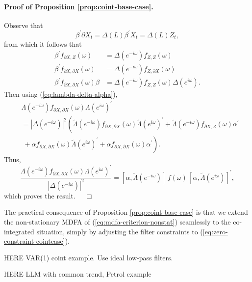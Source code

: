 \documentclass[a4paper]{book}
\begin{document}
\paragraph{Proof of Proposition \ref{prop:coint-base-case}.}
 Observe that 
\[  
  \beta^{\prime} \partial X_t = \Delta (L) \beta^{\prime} X_t = \Delta (L) Z_t,
\]
  from which it follows that
\begin{align*}
  \beta^{\prime} f_{\partial X, Z} (\omega) & =  \Delta (e^{-i \omega}) f_{Z,Z} (\omega) \\
    \beta^{\prime} f_{\partial X, \partial X} (\omega) & =  
    \Delta (e^{-i \omega}) f_{Z,\partial X} (\omega) \\
   \beta^{\prime} f_{\partial X, \partial X} (\omega) \beta & =  
    \Delta (e^{-i \omega}) f_{Z,Z} (\omega) \Delta (e^{i \omega}).
\end{align*}
 Then using   (\ref{eq:lambda-delta-alpha}), 
\begin{align*}
 & \Lambda (e^{-i \omega}) f_{\partial X, \partial X} (\omega) 
   {\Lambda (e^{i \omega}) }^{\prime}  \\
  & = {| \Delta (e^{-i \omega}) |}^2 
   \left( \widetilde{\Lambda} (e^{-i \omega}) f_{\partial X, \partial X} (\omega)
     {\widetilde{\Lambda} (e^{i \omega}) }^{\prime} +
      \widetilde{\Lambda} (e^{-i \omega}) f_{\partial X, Z} (\omega)
     {\alpha }^{\prime} \right. \\
 & \;  +    \left. \alpha f_{\partial X, \partial X} (\omega)
     {\widetilde{\Lambda} (e^{i \omega}) }^{\prime} +
     \alpha f_{\partial X, \partial X} (\omega)  { \alpha }^{\prime} \right).
  \end{align*}
Thus,
\[
  \frac{  \Lambda (e^{-i \omega}) f_{\partial X, \partial X} (\omega) 
   {\Lambda (e^{i \omega}) }^{\prime}  }{ {| \Delta (e^{-i \omega}) |}^2 }
   =  [ \alpha,  \widetilde{\Lambda} (e^{-i \omega}) ]\,   f (\omega) \,
  {  [ \alpha,  \widetilde{\Lambda} (e^{i \omega}) ] }^{\prime},
\]
  which proves the result. $\quad \Box$
  
\vspace{.5cm}

The practical consequence of Proposition \ref{prop:coint-base-case} is that
 we extend the non-stationary MDFA of (\ref{eq:mdfa-criterion-nonstat})
 seamlessly to the co-integrated situation, simply by adjusting the 
 filter constraints to (\ref{eq:zero-constraint-cointcase}).
  

HERE   VAR(1) coint example.  Use ideal low-pass filters.


HERE  LLM with common trend,  Petrol example
\end{document}
